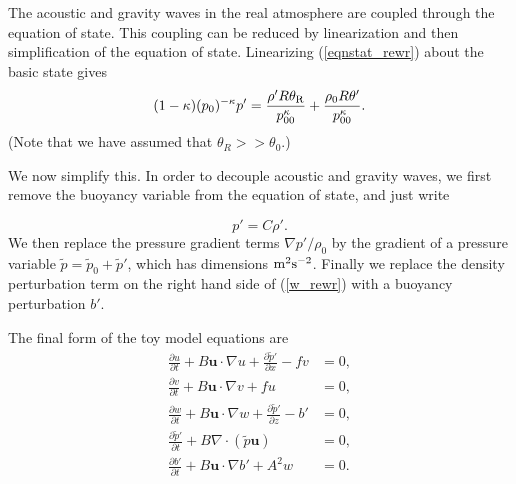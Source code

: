 \documentclass[times]{qjrms4}
\begin{document}
The acoustic and gravity waves in the real atmosphere are coupled \citep{thuburn1} through the equation of state. This coupling can be reduced by linearization and then simplification of the equation of state. 
Linearizing (\ref{eqnstat_rewr}) about the basic state gives
   \begin{equation}\label{LinEqnState}
  (1-\kappa) (p_0)^{-\kappa} p' = \frac {\rho' R   \theta_{\rm R}}{p_{00}^{\kappa}}
                                 + \frac {\rho_0 R  \theta'}{p_{00}^{\kappa}} .
   \end{equation}
(Note that we have assumed that $\theta_R >> \theta_0$.)
 

We now simplify this. In order to decouple acoustic and gravity waves, we first remove the buoyancy variable from the equation of state, and just write

 \begin{equation} \label{simp_eqnstate}
    p' = C \rho'.
  \end{equation}
%
\noindent We then replace the pressure gradient terms $\nabla p'/\rho_0$ by the gradient of a pressure variable $\tilde{p} = \tilde{p}_0+\tilde{p}' $, which  
has dimensions $\rm{m}^2 \rm{s}^{-2}$. Finally we replace the density perturbation term on the right hand side of (\ref{w_rewr}) with a buoyancy perturbation $b'$.

The final form of the toy model equations are
\begin{subequations} \label{final_eqns}
\begin{align}
    \frac{\partial u}{\partial t} + B \mathbf u \cdot \nabla u + 
    \frac{\partial \tilde{p}'}{\partial x} - fv  &=  0, 
    \label{u_final} \\
   \frac{\partial v}{\partial t} + B \mathbf u \cdot \nabla v + fu &= 0, 
   \label{v_final} \\
     \frac{\partial w}{\partial t} + B \mathbf u \cdot \nabla w + 
     \frac{\partial \tilde{p}' }{\partial z} - b' &= 0, 
     \label{w_final}\\
   \frac {\partial \tilde{p}'}{\partial t} + B \nabla \cdot  
   \left(\tilde{p} \mathbf u \right) &= 0, 
   \label{cont_final}\\
 \frac {\partial b'}{\partial t} + B \mathbf u \cdot \nabla b' + A^2 w &= 0.
 \label{thermo_final}
\end{align}
\end{subequations}
\end{document}
